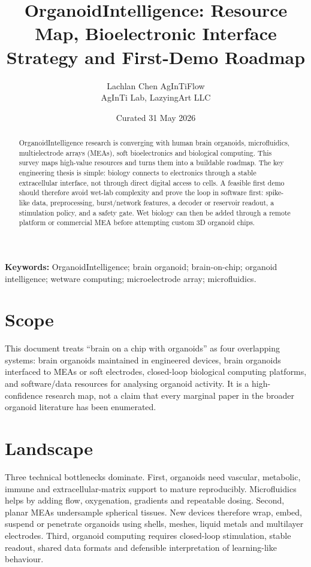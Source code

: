 \documentclass[10pt,twocolumn]{article}
\title{\vspace{-1.5em}\bfseries OrganoidIntelligence: Resource Map, Bioelectronic Interface Strategy and First-Demo Roadmap}
\author{\begin{tabular}{c}Lachlan Chen \quad AgInTiFlow\\AgInTi Lab, LazyingArt LLC\end{tabular}}
\date{Curated 31 May 2026}
\begin{document}
\maketitle

\begin{abstract}
\noindent OrganoidIntelligence research is converging with human brain organoids, microfluidics, multielectrode arrays (MEAs), soft bioelectronics and biological computing. This survey maps high-value resources and turns them into a buildable roadmap. The key engineering thesis is simple: biology connects to electronics through a stable extracellular interface, not through direct digital access to cells. A feasible first demo should therefore avoid wet-lab complexity and prove the loop in software first: spike-like data, preprocessing, burst/network features, a decoder or reservoir readout, a stimulation policy, and a safety gate. Wet biology can then be added through a remote platform or commercial MEA before attempting custom 3D organoid chips.
\end{abstract}

\textbf{Keywords:} OrganoidIntelligence; brain organoid; brain-on-chip; organoid intelligence; wetware computing; microelectrode array; microfluidics.

\section{Scope}

This document treats ``brain on a chip with organoids'' as four overlapping systems: brain organoids maintained in engineered devices, brain organoids interfaced to MEAs or soft electrodes, closed-loop biological computing platforms, and software/data resources for analysing organoid activity. It is a high-confidence research map, not a claim that every marginal paper in the broader organoid literature has been enumerated.

\section{Landscape}

Three technical bottlenecks dominate. First, organoids need vascular, metabolic, immune and extracellular-matrix support to mature reproducibly. Microfluidics helps by adding flow, oxygenation, gradients and repeatable dosing. Second, planar MEAs undersample spherical tissues. New devices therefore wrap, embed, suspend or penetrate organoids using shells, meshes, liquid metals and multilayer electrodes. Third, organoid computing requires closed-loop stimulation, stable readout, shared data formats and defensible interpretation of learning-like behaviour.
\end{document}
